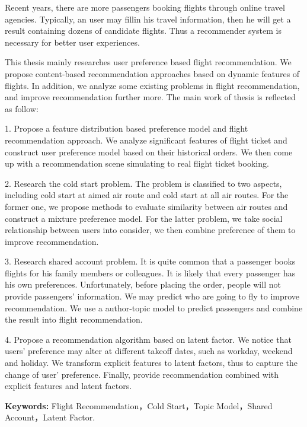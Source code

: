 \begin{englishabstract}
Recent years, there are more passengers booking flights through online travel agencies. Typically, an user may fillin his travel information, then he will get a result containing dozens of candidate flights. Thus a recommender system is necessary for better user experiences.

This thesis mainly researches user preference based flight recommendation. We propose content-based recommendation approaches based on dynamic features of flights. In addition, we analyze some existing problems in flight recommendation, and improve recommendation further more. The main work of thesis is reflected as follow:

1. Propose a feature distribution based preference model and flight recommendation approach. We analyze significant features of flight ticket and construct user preference model based on their historical orders. We then come up with a recommendation scene simulating to real flight ticket booking.

2. Research the cold start problem. The problem is classified to two aspects, including cold start at aimed air route and cold start at all air routes. For the former one, we propose methods to evaluate similarity between air routes and construct a mixture preference model. For the latter problem, we take social relationship between users into consider, we then combine preference of them to improve recommendation.

3. Research shared account problem. It is quite common that a passenger books flights for his family members or colleagues. It is likely that every passenger has his own preferences. Unfortunately, before placing the order, people will not provide passengers' information. We may predict who are going to fly to improve recommendation. We use a author-topic model to predict passengers and combine the result into flight recommendation.

4. Propose a recommendation algorithm based on latent factor. We notice that users' preference may alter at different takeoff dates, such as workday, weekend and holiday. We transform explicit features to latent factors, thus to capture the change of user' preference. Finally, provide recommendation combined with explicit features and latent factors.


\textbf{Keywords:} Flight Recommendation，Cold Start，Topic Model，Shared Account，Latent Factor.
\end{englishabstract}

